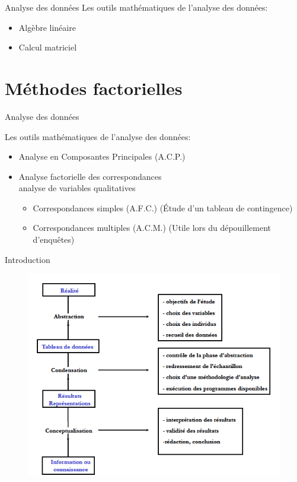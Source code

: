 \documentclass[11pt]{beamer}
\begin{document}
\begin{frame}{Analyse des données}
Les outils mathématiques de l’analyse des données:

\begin{itemize}
\item Algèbre linéaire
\item Calcul matriciel
\end{itemize}
\end{frame}

\section{Méthodes factorielles}
\begin{frame}{Analyse des données}


Les outils mathématiques de l’analyse des données:

\begin{itemize}
\item Analyse en Composantes Principales (A.C.P.)

\item Analyse factorielle des correspondances\\
analyse de variables qualitatives
\begin{itemize}
\item Correspondances simples (A.F.C.) (Étude d’un
tableau de contingence)
\item Correspondances multiples (A.C.M.) (Utile lors du
dépouillement d’enquêtes)
\end{itemize}
\end{itemize}
\end{frame}


\begin{frame}{Introduction}

\begin{figure}
\includegraphics[scale=0.5]{schema2.png} 
\end{figure}
\end{frame}
\end{document}
